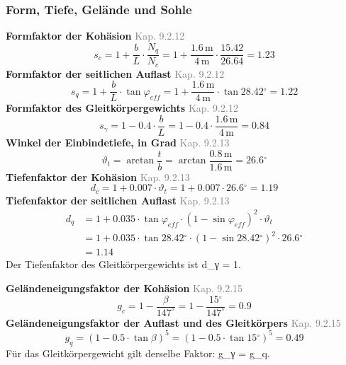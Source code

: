 \documentclass[11pt,a4paper]{article}
\newcommand{\normref}[1]{{\small\textcolor{gray}{#1}}}
\begin{document}
\subsubsection{Form, Tiefe, Gelände und Sohle}
\noindent\textbf{Formfaktor der Kohäsion} \hfill \normref{Kap. 9.2.12}
\begin{equation*}
s_c = 1 + \frac{b}{L} \cdot \frac{N_q}{N_c} = 1 + \frac{1.6\,\mathrm{m}}{4\,\mathrm{m}} \cdot \frac{15.42}{26.64} = 1.23
\end{equation*}
\noindent\textbf{Formfaktor der seitlichen Auflast} \hfill \normref{Kap. 9.2.12}
\begin{equation*}
s_q = 1 + \frac{b}{L} \cdot \tan \varphi_{eff} = 1 + \frac{1.6\,\mathrm{m}}{4\,\mathrm{m}} \cdot \tan 28.42{}^{\circ} = 1.22
\end{equation*}
\noindent\textbf{Formfaktor des Gleitkörpergewichts} \hfill \normref{Kap. 9.2.12}
\begin{equation*}
s_{\gamma} = 1 - 0.4 \cdot \frac{b}{L} = 1 - 0.4 \cdot \frac{1.6\,\mathrm{m}}{4\,\mathrm{m}} = 0.84
\end{equation*}
\noindent\textbf{Winkel der Einbindetiefe, in Grad} \hfill \normref{Kap. 9.2.13}
\begin{equation*}
\vartheta_t = \arctan\frac{t}{b} = \arctan\frac{0.8\,\mathrm{m}}{1.6\,\mathrm{m}} = 26.6{}^{\circ}
\end{equation*}
\noindent\textbf{Tiefenfaktor der Kohäsion} \hfill \normref{Kap. 9.2.13}
\begin{equation*}
d_c = 1 + 0.007 \cdot \vartheta_t = 1 + 0.007 \cdot 26.6{}^{\circ} = 1.19
\end{equation*}
\noindent\textbf{Tiefenfaktor der seitlichen Auflast} \hfill \normref{Kap. 9.2.13}
\begin{equation*}
\begin{aligned}
  d_q &= 1 + 0.035 \cdot \tan \varphi_{eff} \cdot \left(1 - \sin \varphi_{eff}\right)^{2} \cdot \vartheta_t \\
  &= 1 + 0.035 \cdot \tan 28.42{}^{\circ} \cdot \left(1 - \sin 28.42{}^{\circ}\right)^{2} \cdot 26.6{}^{\circ} \\
  &= 1.14
\end{aligned}
\end{equation*}
Der Tiefenfaktor des Gleitkörpergewichts ist d\_γ = 1.

\noindent\textbf{Geländeneigungsfaktor der Kohäsion} \hfill \normref{Kap. 9.2.15}
\begin{equation*}
g_c = 1 - \frac{\beta}{147^\circ} = 1 - \frac{15{}^{\circ}}{147^\circ} = 0.9
\end{equation*}
\noindent\textbf{Geländeneigungsfaktor der Auflast und des Gleitkörpers} \hfill \normref{Kap. 9.2.15}
\begin{equation*}
g_q = \left(1 - 0.5 \cdot \tan \beta\right)^{5} = \left(1 - 0.5 \cdot \tan 15{}^{\circ}\right)^{5} = 0.49
\end{equation*}
Für das Gleitkörpergewicht gilt derselbe Faktor: g\_γ = g\_q.
\end{document}
